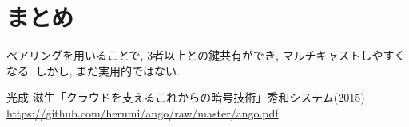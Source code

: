 \documentclass[a4paper,11pt]{jsarticle}
\begin{document}
\section{まとめ}
ペアリングを用いることで, 3者以上との鍵共有ができ,
マルチキャストしやすくなる.
しかし, まだ実用的ではない.

\begin{thebibliography}{99}
  光成 滋生「クラウドを支えるこれからの暗号技術」秀和システム(2015) \url{https://github.com/herumi/ango/raw/master/ango.pdf}
\end{thebibliography}
\end{document}
